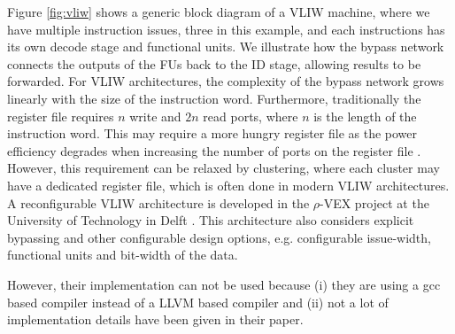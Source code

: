 Figure \ref{fig:vliw} shows a generic block diagram of a VLIW machine, where we have multiple instruction issues, three in this example, and each instructions has its own decode stage and functional units. We illustrate how the bypass network connects the outputs of the FUs back to the ID stage, allowing results to be forwarded. For VLIW architectures, the complexity of the bypass network grows linearly with the size of the instruction word. Furthermore, traditionally the register file requires $n$ write and $2n$ read ports, where $n$ is the length of the instruction word. This may require a more hungry register file as the power efficiency degrades when increasing the number of ports on the register file \cite{compiler_driven_power_opt}. However, this requirement can be relaxed by clustering, where each cluster may have a dedicated register file, which is often done in modern VLIW architectures.\\

A reconfigurable VLIW architecture is developed in the $\rho$-VEX project at the University of Technology in Delft \cite{p-vex}. This architecture also considers explicit bypassing and other configurable design options, e.g. configurable issue-width, functional units and bit-width of the data.

However, their implementation can not be used because (i) they are using a gcc based compiler instead of a LLVM based compiler and (ii) not a lot of implementation details have been given in their paper.





